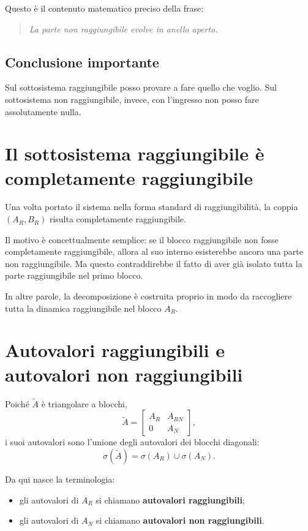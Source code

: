 Questo è il contenuto matematico preciso della frase:
\begin{quote}
\emph{La parte non raggiungibile evolve in anello aperto.}
\end{quote}

\subsection*{Conclusione importante}

Sul sottosistema raggiungibile posso provare a fare quello che voglio.  
Sul sottosistema non raggiungibile, invece, con l’ingresso non posso fare assolutamente nulla.

\section{Il sottosistema raggiungibile è completamente raggiungibile}

Una volta portato il sistema nella forma standard di raggiungibilità, la coppia \((A_R,B_R)\) risulta completamente raggiungibile.

Il motivo è concettualmente semplice: se il blocco raggiungibile non fosse completamente raggiungibile, allora al suo interno esisterebbe ancora una parte non raggiungibile. Ma questo contraddirebbe il fatto di aver già isolato tutta la parte raggiungibile nel primo blocco.

In altre parole, la decomposizione è costruita proprio in modo da raccogliere tutta la dinamica raggiungibile nel blocco \(A_R\).

\section{Autovalori raggiungibili e autovalori non raggiungibili}

Poiché \(\tilde A\) è triangolare a blocchi,
\[
\tilde A=
\begin{bmatrix}
A_R & A_{RN}\\
0 & A_N
\end{bmatrix},
\]
i suoi autovalori sono l’unione degli autovalori dei blocchi diagonali:
\[
\sigma(\tilde A)=\sigma(A_R)\cup\sigma(A_N).
\]

Da qui nasce la terminologia:
\begin{itemize}
    \item gli autovalori di \(A_R\) si chiamano \textbf{autovalori raggiungibili};
    \item gli autovalori di \(A_N\) si chiamano \textbf{autovalori non raggiungibili}.
\end{itemize}

